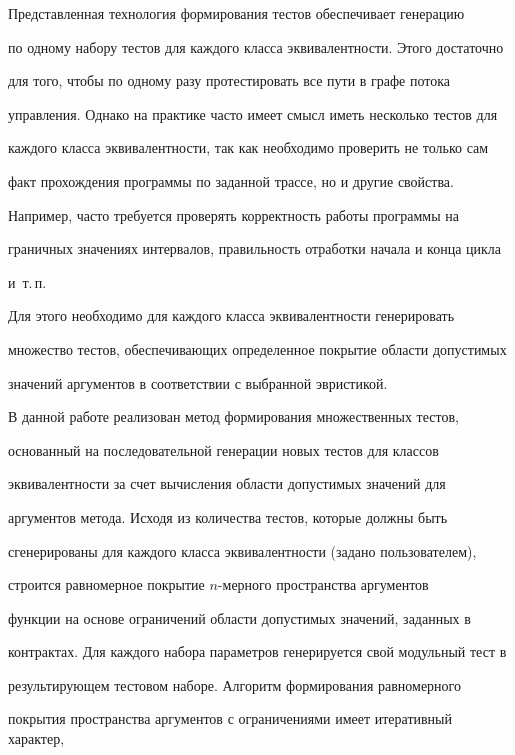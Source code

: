      Представленная технология формирования тестов обеспечивает генерацию


по одному набору тестов для каждого класса эквивалентности. Этого достаточно


для того, чтобы по одному разу протестировать все пути в графе потока


управления. Однако на практике часто имеет смысл иметь несколько тестов для


каждого класса эквивалентности, так как необходимо проверить не только сам


факт прохождения программы по заданной трассе, но и другие свойства.





Например, часто требуется проверять корректность работы программы на


граничных значениях интервалов, правильность отработки начала и конца цикла


и~т.\,п.


%


     Для этого необходимо для каждого класса эквивалентности генерировать


множество тестов, обеспечивающих определенное покрытие области допустимых


значений аргументов в соответствии с выбранной эвристикой.





     В данной работе реализован метод формирования множественных тестов,


основанный на последовательной генерации новых тестов для классов


эквивалентности за счет вычисления области допустимых значений для


аргументов метода. Исходя из количества тестов, которые должны быть


сгенерированы для каждого класса эквивалентности (задано пользователем),


строится равномерное покрытие $n$-мер\-но\-го пространства аргументов


функции на основе ограничений области допустимых значений, заданных в


контрактах. Для каждого набора параметров генерируется свой модульный тест в


результирующем тестовом наборе. Алгоритм формирования равномерного


покрытия пространства аргументов с ограничениями имеет итеративный характер,


